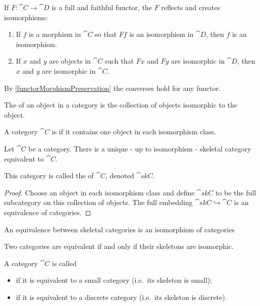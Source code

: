 \begin{lemma} \label{isomorphismCreationReflection}
If $F:\cat{C}\to\cat{D}$ is a full and faithful functor, the $F$  reflects and creates isomorphisms:
\begin{enumerate}
\item If $f$ is a morphism in $\cat{C}$ so that $Ff$ is an isomorphism in $\cat{D}$, then $f$ is an isomorphism.
\item If $x$ and $y$ are objects in $\cat{C}$ such that $Fx$ and $Fy$ are isomorphic in $\cat{D}$, then $x$ and $y$ are isomorphic in $\cat{C}$.
\end{enumerate}
\end{lemma}
By \ref{functorMorphismPreservation} the converses hold for any functor.

\begin{definition}
The  of an object in a category is the collection of objects isomorphic to the object.

A category $\cat{C}$ is  if it contains one object in each isomorphism class.
\end{definition}
\begin{lemma}
Let $\cat{C}$ be a category.
There is a unique - up to isomorphism - skeletal category equivalent to $\cat{C}$.
\end{lemma}
This category is called the  of $\cat{C}$, denoted $\cat{skC}$.
\begin{proof}
Choose an object in each isomorphism class and define $\cat{skC}$ to be the full subcategory on this collection of objects. The full embedding $\cat{skC} \hookrightarrow \cat{C}$ is an equivalence of categories.
\end{proof}

\begin{lemma}
An equivalence between skeletal categories is an isomorphism of categories
\end{lemma}
\begin{corollary}
Two categories are equivalent \textup{if and only if} their skeletons are isomorphic.
\end{corollary}

\begin{definition}
A category $\cat{C}$ is called
\begin{itemize}
\item {} if it is equivalent to a small category (i.e.\ its skeleton is small);
\item {} if it is equivalent to a discrete category (i.e.\ its skeleton is discrete).
\end{itemize}
\end{definition}

